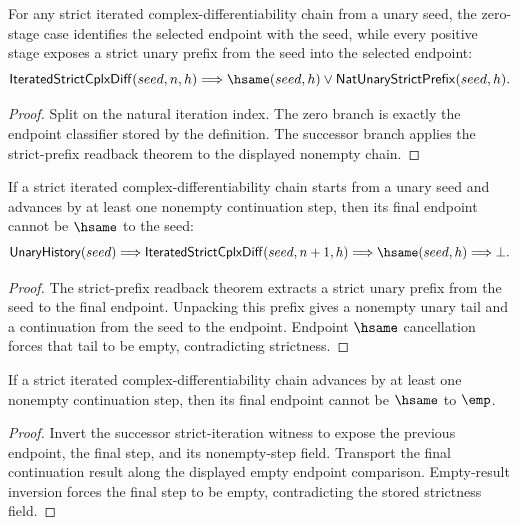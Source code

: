 \begin{theorem}
\label{thm:iterated-strict-cplx-diff-zero-or-strict-prefix}
For any strict iterated complex-differentiability chain from a unary seed, the
zero-stage case identifies the selected endpoint with the seed, while every
positive stage exposes a strict unary prefix from the seed into the selected
endpoint:
$$
\mathsf{IteratedStrictCplxDiff}(seed,n,h)
\Longrightarrow
\hsame(seed,h)\vee\mathsf{NatUnaryStrictPrefix}(seed,h).
$$
\end{theorem}
\begin{proof}
Split on the natural iteration index. The zero branch is exactly the endpoint
classifier stored by the definition. The successor branch applies the
strict-prefix readback theorem to the displayed nonempty chain.
\end{proof}

\begin{theorem}
\label{thm:iterated-strict-cplxdiff-endpoint-hsame-absurd}
If a strict iterated complex-differentiability chain starts from a unary seed
and advances by at least one nonempty continuation step, then its final endpoint
cannot be $\hsame$ to the seed:
$$
\mathsf{UnaryHistory}(seed)
\Longrightarrow
\mathsf{IteratedStrictCplxDiff}(seed,n+1,h)
\Longrightarrow
\hsame(seed,h)
\Longrightarrow
\bot.
$$
\end{theorem}
\begin{proof}
The strict-prefix readback theorem extracts a strict unary prefix from the seed
to the final endpoint. Unpacking this prefix gives a nonempty unary tail and a
continuation from the seed to the endpoint. Endpoint $\hsame$ cancellation
forces that tail to be empty, contradicting strictness.
\end{proof}

\begin{theorem}
\label{thm:iterated-strict-cplxdiff-result-not-empty}
If a strict iterated complex-differentiability chain advances by at least one
nonempty continuation step, then its final endpoint cannot be $\hsame$ to
$\emp$.
\end{theorem}
\begin{proof}
Invert the successor strict-iteration witness to expose the previous endpoint,
the final step, and its nonempty-step field. Transport the final continuation
result along the displayed empty endpoint comparison. Empty-result inversion
forces the final step to be empty, contradicting the stored strictness field.
\end{proof}

